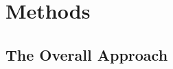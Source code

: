 \documentclass[double,12pt]{beavtex}
\begin{document}
\chapter{Methods}

\section{The Overall Approach}
%
\end{document}
